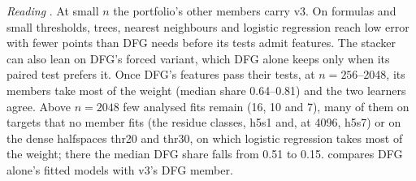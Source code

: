 \emph{Reading} . At small $n$ the portfolio's other members carry v3. On formulas and small thresholds, trees, nearest neighbours and logistic regression reach low error with fewer points than DFG needs before its tests admit features. The stacker can also lean on DFG's forced variant, which DFG alone keeps only when its paired test prefers it. Once DFG's features pass their tests, at $n=256$--2048, its members take most of the weight (median share 0.64--0.81) and the two learners agree. Above $n=2048$ few analysed fits remain (16, 10 and 7), many of them on targets that no member fits (the residue classes, h5s1 and, at 4096, h5s7) or on the dense halfspaces thr20 and thr30, on which logistic regression takes most of the weight; there the median DFG share falls from 0.51 to 0.15.  compares DFG alone's fitted models with v3's DFG member.

